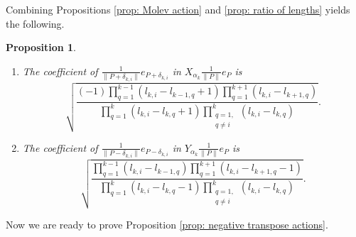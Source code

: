 \documentclass{amsart}[12pt]
\newtheorem{proposition}[theorem]{Proposition}
\theoremstyle{definition}
\numberwithin{equation}{section}
\begin{document}
Combining Propositions \ref{prop: Molev action} and \ref{prop: ratio
  of lengths} yields the following.
\begin{proposition} \label{prop: matrix entries} \mbox{}
  \begin{enumerate}
  \item  The coefficient of $\frac{1}{\| P + \delta_{k,i}\|} e_{P + \delta_{k,i}}$ in $X_{\alpha_k} \frac{1}{\| P \|} e_P$ is 
  \[
    \sqrt{\frac{(-1)
      \displaystyle \prod_{q=1}^{k-1}(l_{k,i}-l_{k-1,q}+1)
      \displaystyle \prod_{q=1}^{k+1}
      (l_{k,i}-l_{k+1,q})}{\displaystyle
      \prod_{q=1}^{k}(l_{k,i}-l_{k,q}+1) \displaystyle \prod_{\substack{q=1,\\q\neq i}}^{k} (l_{k,i}-l_{k,q})}}.
\]
\item The coefficient of $\frac{1}{\| P - \delta_{k,i}\|} e_{P -
    \delta_{k,i}}$ in $Y_{\alpha_k} \frac{1}{\| P \|} e_P$ is 
    \[
    \sqrt{\frac{
      \displaystyle \prod_{q=1}^{k-1}(l_{k,i}-l_{k-1,q})
      \displaystyle \prod_{q=1}^{k+1}
      (l_{k,i}-l_{k+1,q}-1)}{\displaystyle
      \prod_{q=1}^{k}(l_{k,i}-l_{k,q}-1) \displaystyle \prod_{\substack{q=1,\\q\neq i}}^{k} (l_{k,i}-l_{k,q})}}.
\]
\end{enumerate}
\end{proposition}

Now we are ready to prove Proposition \ref{prop: negative transpose actions}.
\end{document}
